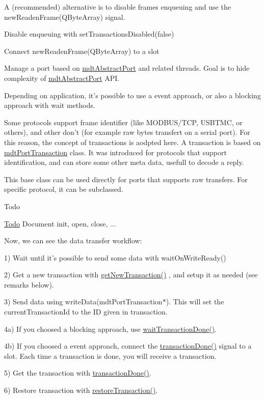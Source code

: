 A (recommended) alternative is to disable frames enqueuing and use the new\-Readen\-Frame(\-Q\-Byte\-Array) signal.
\begin{DoxyItemize}
\item Disable enqueuing with set\-Transactions\-Disabled(false)
\item Connect new\-Readen\-Frame(\-Q\-Byte\-Array) to a slot 


\end{DoxyItemize}

Manage a port based on \hyperlink{classmdt_abstract_port}{mdt\-Abstract\-Port} and related threads. Goal is to hide complexity of \hyperlink{classmdt_abstract_port}{mdt\-Abstract\-Port} A\-P\-I.

Depending on application, it's possible to use a event approach, or also a blocking approach with wait methods.

Some protocols support frame identifier (like M\-O\-D\-B\-U\-S/\-T\-C\-P, U\-S\-B\-T\-M\-C, or others), and other don't (for example raw bytes transfert on a serial port). For this reason, the concept of transactions is aodpted here. A transaction is based on \hyperlink{classmdt_port_transaction}{mdt\-Port\-Transaction} class. It was introduced for protocols that support identification, and can store some other meta data, usefull to decode a reply.

This base class can be used directly for ports that supports raw transfers. For specific protocol, it can be subclassed.

\begin{DoxyRefDesc}{Todo}
\item[\hyperlink{todo__todo000030}{Todo}]Document init, open, close, ...\end{DoxyRefDesc}


Now, we can see the data transfer workflow\-:
\begin{DoxyItemize}
\item 1) Wait until it's possible to send some data with wait\-On\-Write\-Ready()
\item 2) Get a new transaction with \hyperlink{classmdt_port_manager_a75ebd3d1859e3ed38b9558981e53aac4}{get\-New\-Transaction()} , and setup it as needed (see remarks below).
\item 3) Send data using write\-Data(mdt\-Port\-Transaction$\ast$). This will set the current\-Transaction\-Id to the I\-D given in transaction.
\item 4a) If you choosed a blocking approach, use \hyperlink{classmdt_port_manager_a5551802de2c08632078f2cc0e2607913}{wait\-Transaction\-Done()}.
\item 4b) If you choosed a event approach, connect the \hyperlink{classmdt_port_manager_a5869bcf6774a86fb9d3b00a0d4211bb5}{transaction\-Done()} signal to a slot. Each time a transaction is done, you will receive a transaction.
\item 5) Get the transaction with \hyperlink{classmdt_port_manager_a5869bcf6774a86fb9d3b00a0d4211bb5}{transaction\-Done()}.
\item 6) Restore transaction with \hyperlink{classmdt_port_manager_a5fea4a9b8e94d38e8ec699dba05c7ca8}{restore\-Transaction()}.
\end{DoxyItemize}

